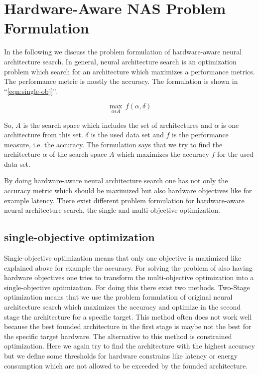 \documentclass[conference]{IEEEtran}
\begin{document}
\section{Hardware-Aware NAS Problem Formulation}
In the following we discuss the problem formulation of hardware-aware neural architecture search. In general, neural architecture search is an optimization problem which search for an architecture which maximizes a performance metrics. The performance metric is mostly the accuracy. The formulation is shown in ``\eqref{eqn:single-obj}''. 
 
\begin{equation}
\label{eqn:single-obj}
\max_{\alpha\epsilon A}\,f(\alpha, \delta)
\end{equation}

So, $A$ is the search space which includes the set of architectures and $\alpha$ is one architecture from this set. $\delta$ is the used data set and $f$ is the performance measure, i.e. the accuracy.  The formulation says that we try to find the architecture $\alpha$ of the search space $A$ which maximizes the accuracy $f$ for the used data set. 
 
By doing hardware-aware neural architecture search one has not only the accuracy metric which should be maximized but also hardware objectives like for example latency. There exist different problem formulation for hardware-aware neural architecture search, the single and multi-objective optimization.

\subsection{single-objective optimization}
Single-objective optimization means that only one objective is maximized like explained above for example the accuracy. For solving the problem of also having hardware objectives one tries to transform the multi-objective optimization into a single-objective optimization. For doing this there exist two methods. Two-Stage optimization means that we use the problem formulation of original neural architecture search which maximizes the accuracy and optimize in the second stage the architecture for a specific target. This method often does not work well because the best founded architecture in the first stage is maybe not the best for the specific target hardware. The alternative to this method is constrained optimization. Here we again try to find the architecture with the highest accuracy but we define some thresholds for hardware constrains like latency or energy consumption which are not allowed to be exceeded by the founded architecture. 
\end{document}
